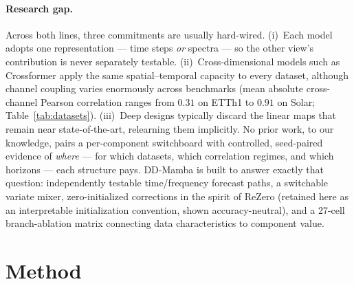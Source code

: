 \documentclass[runningheads]{llncs}
\newcommand{\model}{DD-Mamba}
\begin{document}
\paragraph{Research gap.} Across both lines, three commitments are usually
hard-wired. (i)~Each model adopts one representation --- time steps
\emph{or} spectra --- so the other view's contribution is never separately
testable. (ii)~Cross-dimensional models such as Crossformer apply the same
spatial--temporal capacity to every dataset, although channel coupling
varies enormously across benchmarks (mean absolute cross-channel Pearson
correlation ranges from $0.31$ on ETTh1 to $0.91$ on Solar;
Table~\ref{tab:datasets}). (iii)~Deep designs typically discard the linear
maps that remain near state-of-the-art, relearning them implicitly.
No prior work, to our knowledge, pairs a per-component switchboard with
controlled, seed-paired evidence of \emph{where} --- for which datasets,
which correlation regimes, and which horizons --- each structure pays.
\model{} is built to answer exactly that question: independently testable
time/frequency forecast paths, a switchable variate mixer, zero-initialized
corrections in the spirit of ReZero \cite{rezero} (retained here as an
interpretable initialization convention, shown accuracy-neutral), and a
27-cell branch-ablation matrix connecting data characteristics to component
value.

\section{Method}
\label{sec:method}
\end{document}
